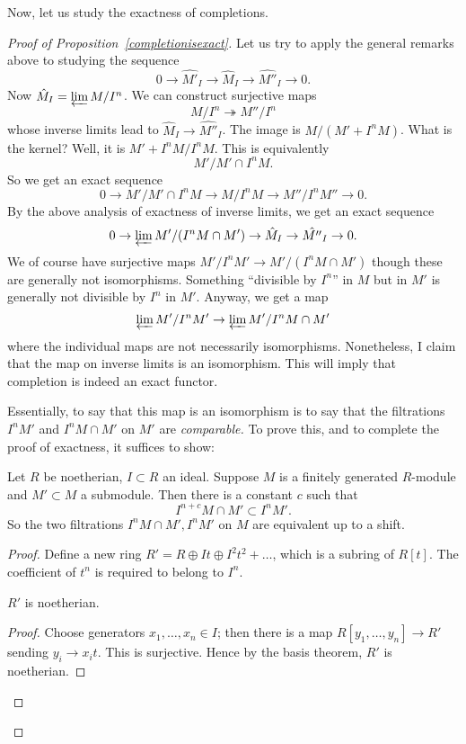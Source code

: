 Now, let us study the exactness of completions.
\begin{proof}[Proof of Proposition~\ref{completionisexact}]

Let us try to apply the general remarks above to studying the sequence 
\[ 0 \to \hat{M'}_I \to \hat{M}_I \to \hat{M''}_I \to 0.  \]
Now $\hat{M}_I = \varprojlim M/I^n$. We can construct  surjective maps
\[ M/I^n \twoheadrightarrow M''/I^n  \]
whose inverse limits lead to $\hat{M}_I \to \hat{M''}_I$. The image is
$M/(M' + I^n M)$. What is the kernel?
Well, it is $M' + I^n M/ I^n M$.  This is equivalently
\[ M'/M' \cap I^n M.  \]
So we get an exact sequence
\[ 0 \to M'/M' \cap I^n M \to M/I^n M \to M''/I^n M'' \to 0.  \]
By the above analysis of exactness of inverse limits, we get an exact sequence
\[ 0 \to \varprojlim M'/(I^n M \cap M') \to \hat{M}_I \to \hat{M''}_I \to 0.  \]
We of course have surjective maps $M'/I^n M' \to M'/(I^n M \cap M') $ though
these are generally not isomorphisms. Something ``divisible by $I^n$'' in $M$ but
in $M'$ is generally not divisible by $I^n$ in $M'$.
Anyway, we get a map
\[ \varprojlim M'/I^n M' \to \varprojlim M'/I^n M \cap M'  \]
where the individual maps are not necessarily isomorphisms. Nonetheless, I
claim that the map on inverse limits is an isomorphism. This will imply that
completion is indeed an exact functor.

Essentially, to say that this map is an isomorphism is to say that the
filtrations $I^n M'$ and $I^n M \cap M'$ on $M'$ are \emph{comparable.} To
prove this, and to complete the proof of exactness, it suffices to show:
\begin{proposition} Let $R$ be noetherian, $I \subset R$ an
ideal. Suppose $M$ is a finitely generated $R$-module and $M' \subset M$ a submodule. Then
there is a  constant $c$ such that
\[ I^{n+c} M \cap M' \subset I^n M'.  \]
So the two filtrations $I^n M \cap M', I^n M'$ on $M$ are equivalent up to a
shift.
\end{proposition} 
\begin{proof} 
Define a new ring $R' = R \oplus It \oplus I^2 t^2 + \dots$, which is a subring of
$R[t]$. The coefficient of $t^n $ is required to belong to $I^n$. 

\begin{lemma} 
$R'$ is noetherian.
\end{lemma} 
\begin{proof} 
Choose generators $x_1, \dots, x_n \in I$; then there is a map $R[y_1, \dots,
y_n] \to R'$ sending $y_i \to x_i t$. This is surjective. Hence by the basis
theorem, $R'$ is noetherian.
\end{proof} 


\end{proof}
\end{proof}
